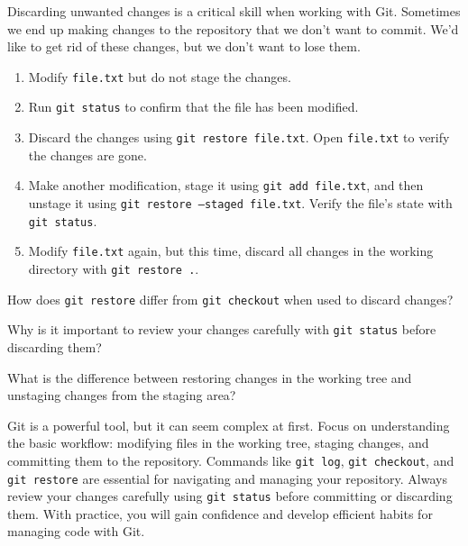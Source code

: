 \begin{challenge}
    \begin{task}
        Discarding unwanted changes is a critical skill when working with Git.
        Sometimes we end up making changes to the repository that we don't want to commit.
        We'd like to get rid of these changes, but we don't want to lose them.
        \begin{enumerate}
            \item Modify \texttt{file.txt} but do not stage the changes.
            \item Run \texttt{git status} to confirm that the file has been modified.
            \item Discard the changes using \texttt{git restore file.txt}. Open \texttt{file.txt} to verify the changes are gone.
            \item Make another modification, stage it using \texttt{git add file.txt}, and then unstage it using \texttt{git restore --staged file.txt}. Verify the file's state with \texttt{git status}.
            \item Modify \texttt{file.txt} again, but this time, discard all changes in the working directory with \texttt{git restore .}.
        \end{enumerate}

        \begin{questions}
            \item How does \texttt{git restore} differ from \texttt{git checkout} when used to discard changes?
            \item Why is it important to review your changes carefully with \texttt{git status} before discarding them?
            \item What is the difference between restoring changes in the working tree and unstaging changes from the staging area?
        \end{questions}
    \end{task}


    \begin{advise}
        Git is a powerful tool, but it can seem complex at first. 
        Focus on understanding the basic workflow: modifying files in the working tree, staging changes, and committing them to the repository. 
        Commands like \texttt{git log}, \texttt{git checkout}, and \texttt{git restore} are essential for navigating and managing your repository. 
        Always review your changes carefully using \texttt{git status} before committing or discarding them. 
        With practice, you will gain confidence and develop efficient habits for managing code with Git.
    \end{advise}
\end{challenge}
